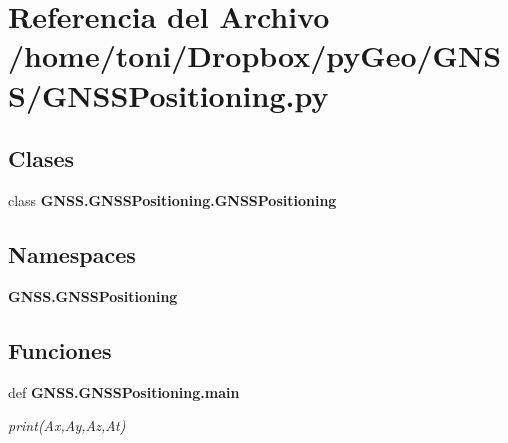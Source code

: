 \section{Referencia del Archivo /home/toni/\-Dropbox/py\-Geo/\-G\-N\-S\-S/\-G\-N\-S\-S\-Positioning.py}
\label{GNSSPositioning_8py}
\subsection*{Clases}
\begin{DoxyCompactItemize}
\item 
class {\bf G\-N\-S\-S.\-G\-N\-S\-S\-Positioning.\-G\-N\-S\-S\-Positioning}
\end{DoxyCompactItemize}
\subsection*{Namespaces}
\begin{DoxyCompactItemize}
\item 
{\bf G\-N\-S\-S.\-G\-N\-S\-S\-Positioning}
\end{DoxyCompactItemize}
\subsection*{Funciones}
\begin{DoxyCompactItemize}
\item 
def {\bf G\-N\-S\-S.\-G\-N\-S\-S\-Positioning.\-main}
\begin{DoxyCompactList}\small\item\em print(\-Ax,\-Ay,\-Az,\-At) \end{DoxyCompactList}\end{DoxyCompactItemize}
